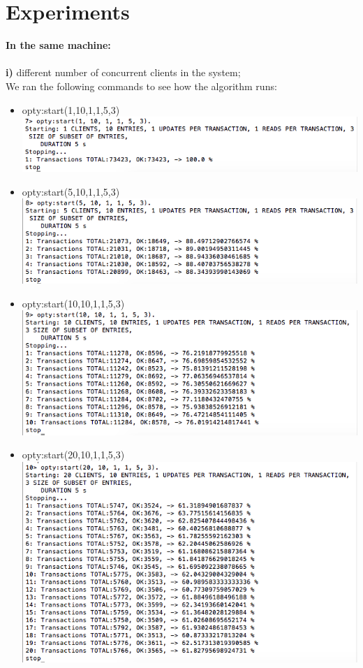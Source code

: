 \documentclass[a4paper, 11pt]{article}
\begin{document}
\section{Experiments}

\textbf{In the same machine:}\\\\
\textbf{i)} different number of concurrent clients in the system;\\
We ran the following commands to see how the algorithm runs:\\
\begin{itemize}
\item opty:start(1,10,1,1,5,3)\\
\includegraphics[scale=0.5]{images/exp-i-1.png} \\
\item opty:start(5,10,1,1,5,3)\\
\includegraphics[scale=0.5]{images/exp-i-2.png} \\
\item opty:start(10,10,1,1,5,3)\\
\includegraphics[scale=0.5]{images/exp-i-3.png} \\
\item opty:start(20,10,1,1,5,3)\\
\includegraphics[scale=0.5]{images/exp-i-4.png} \\

\end{itemize}
\end{document}
